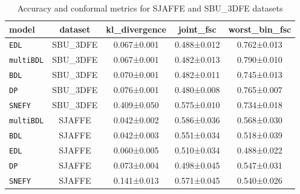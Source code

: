 \begin{table}[h]
\centering
\caption{Accuracy and conformal metrics for SJAFFE and SBU\_3DFE datasets}
\label{tab:sjaffe_sbu_accuracy}

\begin{tabular}{lcccc}
\toprule
\textbf{model} & \textbf{dataset} & \textbf{kl\_divergence} & \textbf{joint\_fsc} & \textbf{worst\_bin\_fsc} \\
\midrule
\texttt{EDL} & SBU\_3DFE & 0.067±0.001 & 0.488±0.012 & 0.762±0.013 \\
\texttt{multiBDL} & SBU\_3DFE & 0.067±0.001 & 0.482±0.013 & 0.790±0.010 \\
\texttt{BDL} & SBU\_3DFE & 0.070±0.001 & 0.482±0.011 & 0.745±0.013 \\
\texttt{DP} & SBU\_3DFE & 0.076±0.001 & 0.480±0.008 & 0.765±0.007 \\
\texttt{SNEFY} & SBU\_3DFE & 0.409±0.050 & 0.575±0.010 & 0.734±0.018 \\
\texttt{multiBDL} & SJAFFE & 0.042±0.002 & 0.586±0.036 & 0.568±0.030 \\
\texttt{BDL} & SJAFFE & 0.042±0.003 & 0.551±0.034 & 0.518±0.039 \\
\texttt{EDL} & SJAFFE & 0.060±0.005 & 0.510±0.034 & 0.488±0.022 \\
\texttt{DP} & SJAFFE & 0.073±0.004 & 0.498±0.045 & 0.547±0.031 \\
\texttt{SNEFY} & SJAFFE & 0.141±0.013 & 0.571±0.045 & 0.540±0.026 \\
\bottomrule
\end{tabular}

\end{table}